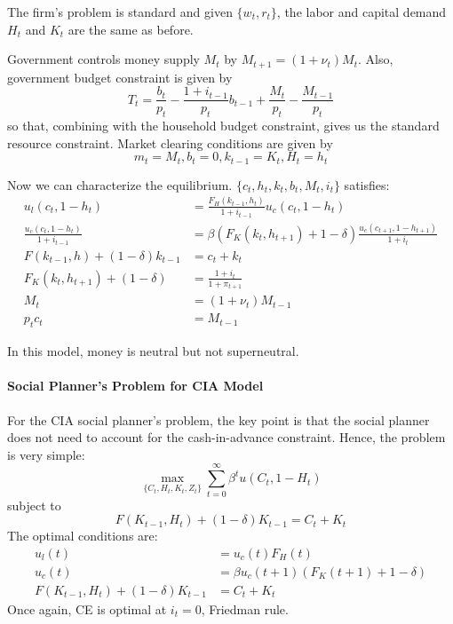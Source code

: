 \documentclass[12pt]{article}
\begin{document}
The firm's problem is standard and given $\{w_t, r_t\}$, the labor and capital demand $H_t$ and $K_t$ are the same as before. 

Government controls money supply $M_t$ by $M_{t+1} = (1+\nu_t) M_t$. Also, government budget constraint is given by
\[T_t = \frac{b_t}{p_t} - \frac{1+i_{t-1}}{p_t} b_{t-1} + \frac{M_t}{p_t} - \frac{M_{t-1}}{p_t} \]
so that, combining with the household budget constraint, gives us the standard resource constraint. Market clearing conditions are given by
\[m_t = M_t, b_t = 0, k_{t-1} = K_t, H_t = h_t\]

Now we can characterize the equilibrium. $\{c_t, h_t, k_t, b_t, M_t, i_t\}$ satisfies:
\begin{align}
	u_l(c_t, 1-h_t) &= \frac{F_H(k_{t-1}, h_t)}{1 + i_{t-1}}u_c(c_t, 1-h_t)\\
	\frac{u_c(c_t, 1-h_t)}{1 + i_{t-1}} &= \beta (F_K(k_{t}, h_{t+1}) + 1 - \delta)\frac{u_c(c_{t+1}, 1-h_{t+1})}{1 + i_{t}}\\
	F(k_{t-1}, h) + (1-\delta)k_{t-1} &= c_t + k_t\\
	F_K(k_t, h_{t+1}) + (1-\delta) &= \frac{1 + i_t}{1 + \pi_{t+1}}\\
	M_t &= (1 + \nu_t) M_{t-1}\\
	p_tc_t &= M_{t-1}
\end{align}
\begin{proposition}
	In this model, money is neutral but not superneutral.
\end{proposition}

\paragraph{Social Planner's Problem for CIA Model \\ [6pt]}
For the CIA social planner's problem, the key point is that the social planner does not need to account for the cash-in-advance constraint. Hence, the problem is very simple:
\begin{equation*}
	\max_{\{C_t, H_t, K_t, Z_t\}} \sum_{t=0}^\infty \beta^t u(C_t, 1-H_t)
\end{equation*}
subject to
\begin{equation}
	F(K_{t-1}, H_t) + (1-\delta) K_{t-1} = C_t + K_t
\end{equation}
The optimal conditions are:
\begin{align}
	u_l(t) &= u_c(t)F_H(t)\\
	u_c(t) &= \beta u_c(t+1)(F_K(t+1) + 1-\delta)\\
	F(K_{t-1}, H_t) + (1-\delta) K_{t-1} &= C_t + K_t
\end{align}
Once again, CE is optimal at $i_{t} = 0$, Friedman rule.
\end{document}
